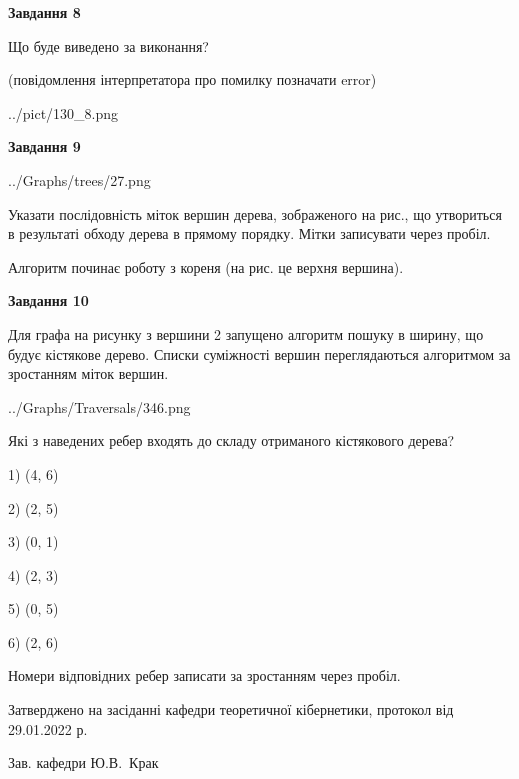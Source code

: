 \documentclass[12pt, ukrainian]{article}
\begin{document}
{\begin {large}
{\begin {center}\textbf{Завдання 8}\end {center}}\par
Що буде виведено за виконання?\par
 (повідомлення інтерпретатора про помилку позначати error)\par
\begin{center}
	{../pict/130_8.png}
\end{center}
\newpage

{\begin {center}\textbf{Завдання 9}\end {center}}\par

\begin{center}
	{../Graphs/trees/27.png}
\end{center}
Указати послідовність міток вершин дерева, зображеного на рис., що утвориться в результаті обходу дерева в прямому порядку. Мітки записувати через пробіл.\par Алгоритм починає роботу з кореня (на рис. це верхня вершина).\par
\newpage

{\begin {center}\textbf{Завдання 10}\end {center}}\par
Для графа на рисунку з вершини 2 запущено алгоритм пошуку в ширину, що будує кістякове дерево. Списки суміжності вершин переглядаються алгоритмом за зростанням міток вершин.\par
\begin{center}
	{../Graphs/Traversals/346.png}
\end{center}
\par Які з наведених ребер входять до складу отриманого кістякового дерева?\par
1) (4, 6)\par
2) (2, 5)\par
3) (0, 1)\par
4) (2, 3)\par
5) (0, 5)\par
6) (2, 6)\par
{\vskip 15pt} Номери відповідних ребер записати за зростанням через пробіл.\par
\newpage


\end {large}
}
{\smallskip \begin {small} Затверджено на засіданні кафедри теоретичної кібернетики, протокол  від   29.01.2022 р.\par\smallskip\smallskip
{\parbox {6.5 cm}{Зав. кафедри \dotfill Ю.В.~Крак}} \end{small}}
\end{document}
